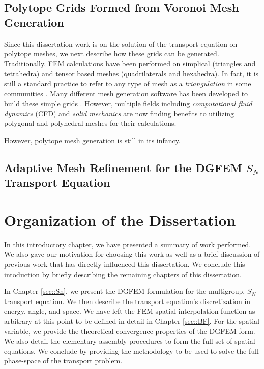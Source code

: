 \subsection{Polytope Grids Formed from Voronoi Mesh Generation}
\label{sec::Intro_Past_Voronoi}

Since this dissertation work is on the solution of the transport equation on polytope meshes, we next describe how these grids can be generated. Traditionally, FEM calculations have been performed on simplical (triangles and tetrahedra) and tensor based meshes (quadrilaterals and hexahedra). In fact, it is still a standard practice to refer to any type of mesh as a {\em triangulation} in some communities \cite{ern2013theory}. Many different mesh generation software has been developed to build these simple grids \cite{shewchuk1996triangle,shewchuk2002delaunay,si2015tetgen,geuzaine2009gmsh}. However, multiple fields including {\em computational fluid dynamics} (CFD) and {\em solid mechanics} are now finding benefits to utilizing polygonal and polyhedral meshes for their calculations.

However, polytope mesh generation is still in its infancy. 

\subsection{Adaptive Mesh Refinement for the DGFEM $S_N$ Transport Equation}
\label{sec::Intro_Past_AMR}



\section{Organization of the Dissertation}
\label{sec::Intro_Organization}

In this introductory chapter, we have presented a summary of work performed. We also gave our motivation for choosing this work as well as a brief discussion of previous work that has directly influenced this dissertation. We conclude this intoduction by briefly describing the remaining chapters of this dissertation.

In Chapter \ref{sec::Sn}, we present the DGFEM formulation for the multigroup, $S_N$ transport equation. We then describe the transport equation's discretization in energy, angle, and space. We have left the FEM spatial interpolation function as arbitrary at this point to be defined in detail in Chapter \ref{sec::BF}. For the spatial variable, we provide the theoretical convergence properties of the DGFEM form. We also detail the elementary assembly procedures to form the full set of spatial equations. We conclude by providing the methodology to be used to solve the full phase-space of the transport problem.


